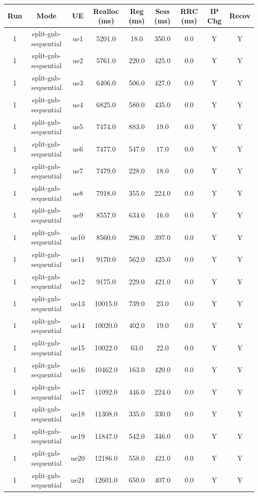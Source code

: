\begin{table}[ht]
\centering
\begin{tabular}{|c|c|c|c|c|c|c|c|c|}
\hline
Run & Mode & UE & Realloc (ms) & Reg (ms) & Sess (ms) & RRC (ms) & IP Chg & Recov \\
\hline
1 & split-gnb-sequential & ue1 & 5201.0 & 18.0 & 350.0 & 0.0 & Y & Y \\
1 & split-gnb-sequential & ue2 & 5761.0 & 220.0 & 425.0 & 0.0 & Y & Y \\
1 & split-gnb-sequential & ue3 & 6406.0 & 506.0 & 427.0 & 0.0 & Y & Y \\
1 & split-gnb-sequential & ue4 & 6825.0 & 580.0 & 435.0 & 0.0 & Y & Y \\
1 & split-gnb-sequential & ue5 & 7474.0 & 883.0 & 19.0 & 0.0 & Y & Y \\
1 & split-gnb-sequential & ue6 & 7477.0 & 547.0 & 17.0 & 0.0 & Y & Y \\
1 & split-gnb-sequential & ue7 & 7479.0 & 228.0 & 18.0 & 0.0 & Y & Y \\
1 & split-gnb-sequential & ue8 & 7918.0 & 355.0 & 224.0 & 0.0 & Y & Y \\
1 & split-gnb-sequential & ue9 & 8557.0 & 634.0 & 16.0 & 0.0 & Y & Y \\
1 & split-gnb-sequential & ue10 & 8560.0 & 296.0 & 397.0 & 0.0 & Y & Y \\
1 & split-gnb-sequential & ue11 & 9170.0 & 562.0 & 425.0 & 0.0 & Y & Y \\
1 & split-gnb-sequential & ue12 & 9175.0 & 229.0 & 421.0 & 0.0 & Y & Y \\
1 & split-gnb-sequential & ue13 & 10015.0 & 739.0 & 23.0 & 0.0 & Y & Y \\
1 & split-gnb-sequential & ue14 & 10020.0 & 402.0 & 19.0 & 0.0 & Y & Y \\
1 & split-gnb-sequential & ue15 & 10022.0 & 63.0 & 22.0 & 0.0 & Y & Y \\
1 & split-gnb-sequential & ue16 & 10462.0 & 163.0 & 420.0 & 0.0 & Y & Y \\
1 & split-gnb-sequential & ue17 & 11092.0 & 446.0 & 224.0 & 0.0 & Y & Y \\
1 & split-gnb-sequential & ue18 & 11308.0 & 335.0 & 330.0 & 0.0 & Y & Y \\
1 & split-gnb-sequential & ue19 & 11847.0 & 542.0 & 346.0 & 0.0 & Y & Y \\
1 & split-gnb-sequential & ue20 & 12186.0 & 558.0 & 421.0 & 0.0 & Y & Y \\
1 & split-gnb-sequential & ue21 & 12601.0 & 650.0 & 407.0 & 0.0 & Y & Y \\

\end{tabular}
\end{table}
